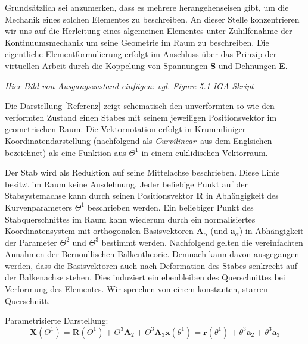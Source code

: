 \documentclass[german,a4paper,12pt,oneside]{scrbook}
\theoremstyle{definition}
\theoremstyle{definition}
\theoremstyle{definition}
\theoremstyle{definition}
\theoremstyle{definition}
\theoremstyle{definition}
\begin{document}
Grundsätzlich sei anzumerken, dass es  mehrere herangehenseisen gibt, um die Mechanik eines solchen Elementes zu beschreiben. An dieser Stelle konzentrieren wir uns auf die Herleitung eines algemeinen Elementes unter Zuhilfenahme der Kontinuumsmechanik um seine Geometrie im Raum zu beschreiben. Die eigentliche Elementformulierung erfolgt im Anschluss über das Prinzip der virtuellen Arbeit durch die Koppelung von Spannungen \textbf{S} und Dehnungen \textbf{E}. 

\LARGE %
\emph{Hier Bild von Ausgangszustand einfügen: vgl. Figure 5.1 IGA Skript}

\normalsize
Die Darstellung [Referenz] zeigt schematisch den unverformten so wie den verformten Zustand einen Stabes mit seinem jeweiligen Positionsvektor im geometrischen Raum. Die Vektornotation erfolgt in Krummliniger Koordinatendarstellung (nachfolgend als \glqq\emph{Curvilinear}\grqq ~aus dem Englsichen bezeichnet) als eine Funktion aus $\Theta^1$ in einem euklidischen Vektorraum.

Der Stab wird als Reduktion auf seine Mittelachse beschrieben. Diese Linie besitzt im Raum keine Ausdehnung. Jeder beliebige Punkt auf der Stabsystemachse kann durch seinen Positionsvektor \textbf{R} in Abhängigkeit des Kurvenparameters $\Theta^1$ beschrieben werden. Ein beliebiger Punkt des Stabquerschnittes im Raum kann wiederum durch ein normalisiertes Koordinatensystem mit orthogonalen Basisvektoren \textbf{A}$_{\alpha}$ (und \textbf{a}$_{\alpha}$) in Abhängigkeit der Parameter $\Theta^2$ und $\Theta^3$ bestimmt werden. Nachfolgend gelten die vereinfachten Annahmen der Bernoullischen Balkentheorie. Demnach kann davon ausgegangen werden, dass die Basisvektoren auch nach Deformation des Stabes senkrecht auf der Balkenachse stehen. Dies induziert ein ebenbleiben des Querschnittes bei Verformung des Elementes. Wir sprechen von einem konstanten, starren Querschnitt.

\vspace{1.0cm}
Parametrisierte Darstellung:
\begin{subequations}
    \begin{equation} \label{Positionsvektor_a}
        \bm{X}(\Theta^1) = \bm{R}(\Theta^1) + \Theta^3\bm{A}_2 + \Theta^3\bm{A}_3 
    \end{equation}
    \begin{equation} \label{Positionsvektor_b}
        \bm{x}(\theta^1) = \bm{r}(\theta^1) + \theta^3\bm{a}_2 + \theta^3\bm{a}_3  
    \end{equation}
\end{subequations}
\end{document}
